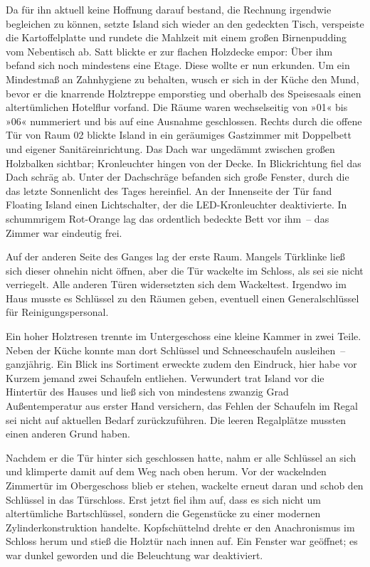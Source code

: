 Da für ihn aktuell keine Hoffnung darauf bestand, die Rechnung irgendwie begleichen zu können, setzte Island sich wieder an den gedeckten Tisch, verspeiste die Kartoffelplatte und rundete die Mahlzeit mit einem großen Birnenpudding vom Nebentisch ab. Satt blickte er zur flachen Holzdecke empor: Über ihm befand sich noch mindestens eine Etage. Diese wollte er nun erkunden. Um ein Mindestmaß an Zahnhygiene zu behalten, wusch er sich in der Küche den Mund, bevor er die knarrende Holztreppe emporstieg und oberhalb des Speisesaals einen altertümlichen Hotelflur vorfand. Die Räume waren wechselseitig von »01« bis »06« nummeriert und bis auf eine Ausnahme geschlossen. Rechts durch die offene Tür von Raum 02 blickte Island in ein geräumiges Gastzimmer mit Doppelbett und eigener Sanitäreinrichtung. Das Dach war ungedämmt zwischen großen Holzbalken sichtbar; Kronleuchter hingen von der Decke. In Blickrichtung fiel das Dach schräg ab. Unter der Dachschräge befanden sich große Fenster, durch die das letzte Sonnenlicht des Tages hereinfiel. An der Innenseite der Tür fand Floating Island einen Lichtschalter, der die LED-Kronleuchter deaktivierte. In schummrigem Rot-Orange lag das ordentlich bedeckte Bett vor ihm~– das Zimmer war eindeutig frei.

Auf der anderen Seite des Ganges lag der erste Raum. Mangels Türklinke ließ sich dieser ohnehin nicht öffnen, aber die Tür wackelte im Schloss, als sei sie nicht verriegelt. Alle anderen Türen widersetzten sich dem Wackeltest. Irgendwo im Haus musste es Schlüssel zu den Räumen geben, eventuell einen Generalschlüssel für Reinigungspersonal.

Ein hoher Holztresen trennte im Untergeschoss eine kleine Kammer in zwei Teile. Neben der Küche konnte man dort Schlüssel und Schneeschaufeln ausleihen~– ganzjährig. Ein Blick ins Sortiment erweckte zudem den Eindruck, hier habe vor Kurzem jemand zwei Schaufeln entliehen. Verwundert trat Island vor die Hintertür des Hauses und ließ sich von mindestens zwanzig Grad Außentemperatur aus erster Hand versichern, das Fehlen der Schaufeln im Regal sei nicht auf aktuellen Bedarf zurückzuführen. Die leeren Regalplätze mussten einen anderen Grund haben.

Nachdem er die Tür hinter sich geschlossen hatte, nahm er alle Schlüssel an sich und klimperte damit auf dem Weg nach oben herum. Vor der wackelnden Zimmertür im Obergeschoss blieb er stehen, wackelte erneut daran und schob den Schlüssel in das Türschloss. Erst jetzt fiel ihm auf, dass es sich nicht um altertümliche Bartschlüssel, sondern die Gegenstücke zu einer modernen Zylinderkonstruktion handelte. Kopfschüttelnd drehte er den Anachronismus im Schloss herum und stieß die Holztür nach innen auf. Ein Fenster war geöffnet; es war dunkel geworden und die Beleuchtung war deaktiviert.

